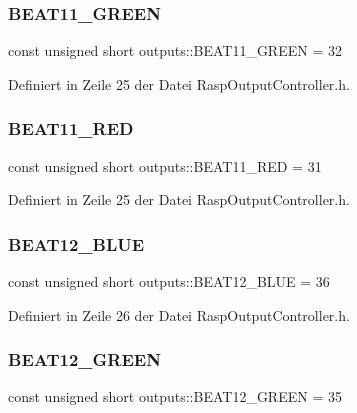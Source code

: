 \subsubsection{\texorpdfstring{B\+E\+A\+T11\+\_\+\+G\+R\+E\+EN}{BEAT11\_GREEN}}
{\footnotesize\ttfamily const unsigned short outputs\+::\+B\+E\+A\+T11\+\_\+\+G\+R\+E\+EN = 32}



Definiert in Zeile 25 der Datei Rasp\+Output\+Controller.\+h.

\mbox{\label{namespaceoutputs_a3b55bd1a681764d7655dfee327930872}} 
\subsubsection{\texorpdfstring{B\+E\+A\+T11\+\_\+\+R\+ED}{BEAT11\_RED}}
{\footnotesize\ttfamily const unsigned short outputs\+::\+B\+E\+A\+T11\+\_\+\+R\+ED = 31}



Definiert in Zeile 25 der Datei Rasp\+Output\+Controller.\+h.

\mbox{\label{namespaceoutputs_ae7b144325945c1712151bf0d6a363c5f}} 
\subsubsection{\texorpdfstring{B\+E\+A\+T12\+\_\+\+B\+L\+UE}{BEAT12\_BLUE}}
{\footnotesize\ttfamily const unsigned short outputs\+::\+B\+E\+A\+T12\+\_\+\+B\+L\+UE = 36}



Definiert in Zeile 26 der Datei Rasp\+Output\+Controller.\+h.

\mbox{\label{namespaceoutputs_a863de14249bb5dd32b6fb2dd665f804e}} 
\subsubsection{\texorpdfstring{B\+E\+A\+T12\+\_\+\+G\+R\+E\+EN}{BEAT12\_GREEN}}
{\footnotesize\ttfamily const unsigned short outputs\+::\+B\+E\+A\+T12\+\_\+\+G\+R\+E\+EN = 35}



